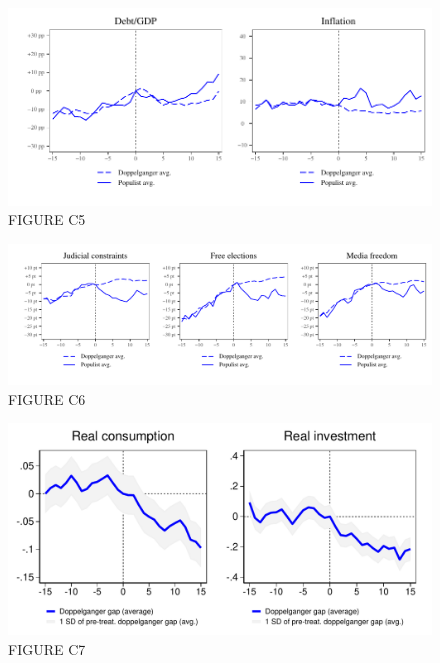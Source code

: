 \documentclass{article}
\begin{document}
\clearpage

\begin{figure}	
	\caption{FIGURE C5} 
		\includegraphics[scale=0.8]{FigureC5}\centering	
\end{figure}

\clearpage

\begin{figure}	
	\caption{FIGURE C6} 
		\includegraphics[scale=0.8]{FigureC6}\centering	
\end{figure}

\clearpage

\begin{figure}	
	\caption{FIGURE C7} 
		\includegraphics[scale=0.7]{FigureC7}\centering	
\end{figure}
\end{document}
